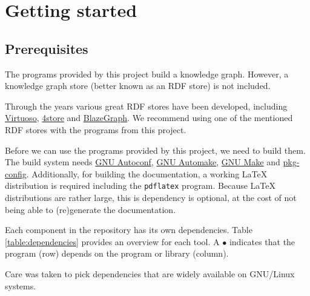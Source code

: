 \chapter{Getting started}

\section{Prerequisites}
\label{sec:prerequisites}

  The programs provided by this project build a knowledge graph.  However,
  a knowledge graph store (better known as an RDF store) is not included.

  Through the years various great RDF stores have been developed, including
  \href{https://virtuoso.openlinksw.com/}{Virtuoso},
  \href{https://github.com/4store/4store}{4store} and
  \href{https://www.blazegraph.com/}{BlazeGraph}.  We recommend using one of
  the mentioned RDF stores with the programs from this project.

  Before we can use the programs provided by this project, we need to build
  them.  The build system needs
  \href{https://www.gnu.org/software/autoconf}{GNU Autoconf},
  \href{https://www.gnu.org/software/automake}{GNU Automake},
  \href{https://www.gnu.org/software/make}{GNU Make} and
  \href{https://www.freedesktop.org/wiki/Software/pkg-config/}{pkg-config}.
  Additionally, for building the documentation, a working \LaTeX{} distribution is
  required including the \texttt{pdflatex} program.  Because \LaTeX{} distributions
  are rather large, this is dependency is optional, at the cost of not being able
  to (re)generate the documentation.

  Each component in the repository has its own dependencies.  Table
  \ref{table:dependencies} provides an overview for each tool.  A $\bullet{}$
  indicates that the program (row) depends on the program or library (column).

  Care was taken to pick dependencies that are widely available on GNU/Linux
  systems.

